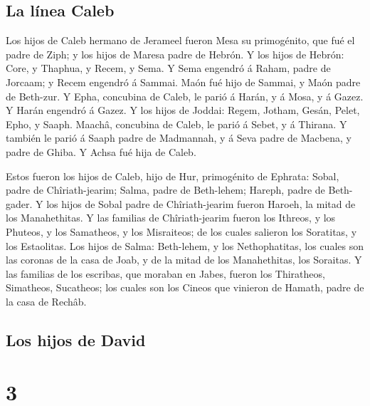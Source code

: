 \hypertarget{la-luxednea-caleb-1}{%
\subsection{La línea Caleb}\label{la-luxednea-caleb-1}}

 Los hijos de Caleb hermano de Jerameel fueron Mesa su
primogénito, que fué el padre de Ziph; y los hijos de Maresa padre de
Hebrón.  Y los hijos de Hebrón: Core, y Thaphua, y Recem,
y Sema.  Y Sema engendró á Raham, padre de Jorcaam; y
Recem engendró á Sammai.  Maón fué hijo de Sammai, y Maón
padre de Beth-zur.  Y Epha, concubina de Caleb, le parió
á Harán, y á Mosa, y á Gazez. Y Harán engendró á Gazez. 
Y los hijos de Joddai: Regem, Jotham, Gesán, Pelet, Epho, y Saaph.
 Maachâ, concubina de Caleb, le parió á Sebet, y á
Thirana.  Y también le parió á Saaph padre de Madmannah,
y á Seva padre de Macbena, y padre de Ghiba. Y Achsa fué hija de Caleb.

 Estos fueron los hijos de Caleb, hijo de Hur,
primogénito de Ephrata: Sobal, padre de Chîriath-jearim; 
Salma, padre de Beth-lehem; Hareph, padre de Beth-gader. 
Y los hijos de Sobal padre de Chîriath-jearim fueron Haroeh, la mitad de
los Manahethitas.  Y las familias de Chîriath-jearim
fueron los Ithreos, y los Phuteos, y los Samatheos, y los Misraiteos; de
los cuales salieron los Soratitas, y los Estaolitas.  Los
hijos de Salma: Beth-lehem, y los Nethophatitas, los cuales son las
coronas de la casa de Joab, y de la mitad de los Manahethitas, los
Soraitas.  Y las familias de los escribas, que moraban en
Jabes, fueron los Thiratheos, Simatheos, Sucatheos; los cuales son los
Cineos que vinieron de Hamath, padre de la casa de Rechâb.

\hypertarget{los-hijos-de-david}{%
\subsection{Los hijos de David}\label{los-hijos-de-david}}

\hypertarget{section-2}{%
\section{3}\label{section-2}}

